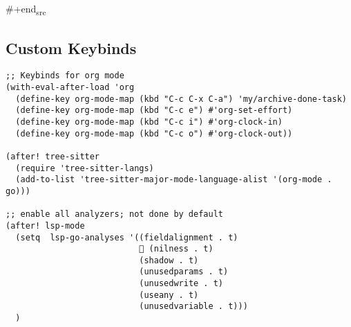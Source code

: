 \documentclass[11pt]{article}
\begin{document}
\#+end\textsubscript{src}
\subsection{Custom Keybinds}
\label{sec:orgfb4c332}
\begin{verbatim}
;; Keybinds for org mode
(with-eval-after-load 'org
  (define-key org-mode-map (kbd "C-c C-x C-a") 'my/archive-done-task)
  (define-key org-mode-map (kbd "C-c e") #'org-set-effort)
  (define-key org-mode-map (kbd "C-c i") #'org-clock-in)
  (define-key org-mode-map (kbd "C-c o") #'org-clock-out))

(after! tree-sitter
  (require 'tree-sitter-langs)
  (add-to-list 'tree-sitter-major-mode-language-alist '(org-mode . go)))

;; enable all analyzers; not done by default
(after! lsp-mode
  (setq  lsp-go-analyses '((fieldalignment . t)
                            (nilness . t)
                           (shadow . t)
                           (unusedparams . t)
                           (unusedwrite . t)
                           (useany . t)
                           (unusedvariable . t)))
  )


\end{verbatim}
\end{document}
